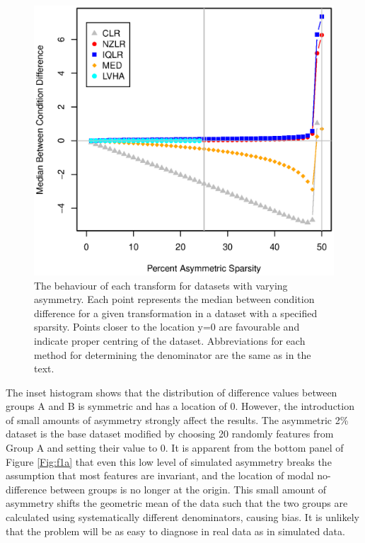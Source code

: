 \documentclass[graybox]{svmult}
\begin{document}
%
\begin{figure}[b]
\sidecaption[t]
\includegraphics[scale=.45]{Fig_failure-book.eps}
%
%
\caption{The behaviour of each transform for datasets with varying asymmetry. Each point represents the median between condition difference for a given transformation in a dataset with a specified sparsity. Points closer to the location y=0 are favourable and indicate proper centring of the dataset. Abbreviations for each method for determining the denominator are the same as in the text.}
\label{Fig:f2a}       %
\end{figure}



The inset histogram shows that the distribution of difference values between groups A and B is symmetric and has a location of 0. However, the introduction of small amounts of asymmetry strongly affect the results. The asymmetric 2\% dataset is the base dataset modified by choosing 20 randomly  features from Group A and setting their value to 0. It is apparent from the bottom  panel of Figure \ref{Fig:f1a} that even this low level of simulated asymmetry breaks the assumption that most features are invariant, and the location of  modal no-difference between groups is no longer at the origin.  This small amount of asymmetry  shifts the geometric mean of the data such that the two groups are calculated using systematically different denominators, causing bias. It is unlikely that the problem will be as easy to diagnose in real data as in simulated data. 
\end{document}
